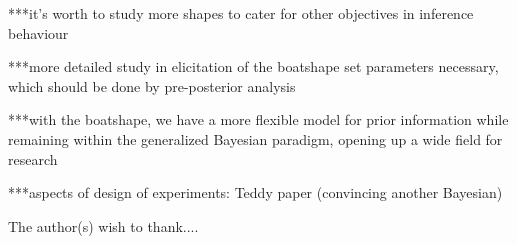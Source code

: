 ***it's worth to study more shapes to cater for other objectives in inference behaviour

***more detailed study in elicitation of the boatshape set parameters necessary,
which should be done by pre-posterior analysis

***with the boatshape, we have a more flexible model for prior information
while remaining within the generalized Bayesian paradigm,
opening up a wide field for research

***aspects of design of experiments: Teddy paper (convincing another Bayesian)








\begin{acknowledgement}
  The author(s) wish to thank....
\end{acknowledgement}

